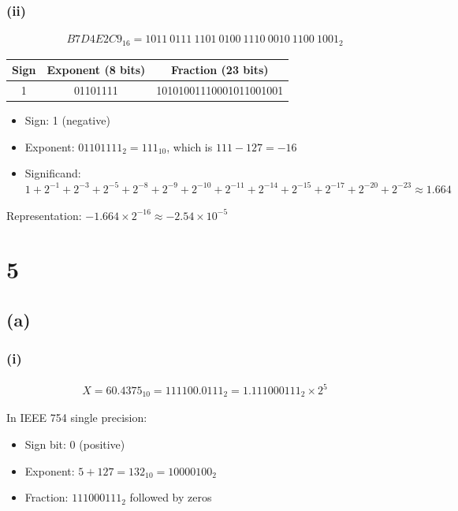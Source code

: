 \documentclass[12pt]{article}
\begin{document}
\subsubsection*{(ii)}

\begin{align*}
B7D4E2C9_{16} = 1011\ 0111\ 1101\ 0100\ 1110\ 0010\ 1100\ 1001_{2}
\end{align*}

\begin{center}
    \begin{tabular}{|c|c|c|}
        \hline
        \textbf{Sign} & \textbf{Exponent (8 bits)} & \textbf{Fraction (23 bits)} \\
        \hline
        1 & 01101111 & 10101001110001011001001 \\
        \hline
    \end{tabular}
\end{center}

\begin{itemize}
    \item Sign: 1 (negative)
    \item Exponent: $01101111_2 = 111_{10}$, which is $111 - 127 = -16$
    \item Significand: $1 + 2^{-1} + 2^{-3} + 2^{-5} + 2^{-8} + 2^{-9} + 2^{-10} + 2^{-11} + 2^{-14} + 2^{-15} + 2^{-17} + 2^{-20} + 2^{-23} \approx 1.664$
\end{itemize}
Representation: $-1.664 \times 2^{-16} \approx -2.54 \times 10^{-5}$

\section*{5}

\subsection*{(a)}

\subsubsection*{(i)}

\begin{align*}
X = 60.4375_{10} = 111100.0111_2 = 1.111000111_2 \times 2^5
\end{align*}

In IEEE 754 single precision:
\begin{itemize}
    \item Sign bit: 0 (positive)
    \item Exponent: $5 + 127 = 132_{10} = 10000100_2$
    \item Fraction: $111000111_2$ followed by zeros
\end{itemize}
\end{document}
